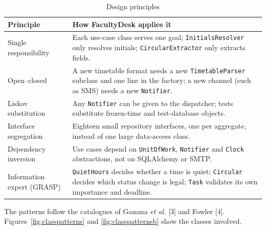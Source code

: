 \begin{xltabular}{\textwidth}{|p{3.6cm}|Y|}
\caption{Design principles}\\
\hline
\textbf{Principle} & \textbf{How FacultyDesk applies it} \\ \hline
Single responsibility & Each use-case class serves one goal; \texttt{InitialsResolver} only resolves initials; \texttt{CircularExtractor} only extracts fields. \\ \hline
Open--closed & A new timetable format needs a new \texttt{TimetableParser} subclass and one line in the factory; a new channel (such as SMS) needs a new \texttt{Notifier}. \\ \hline
Liskov substitution & Any \texttt{Notifier} can be given to the dispatcher; tests substitute frozen-time and test-database objects. \\ \hline
Interface segregation & Eighteen small repository interfaces, one per aggregate, instead of one large data-access class. \\ \hline
Dependency inversion & Use cases depend on \texttt{UnitOfWork}, \texttt{Notifier} and \texttt{Clock} abstractions, not on SQLAlchemy or SMTP. \\ \hline
Information expert (GRASP) & \texttt{QuietHours} decides whether a time is quiet; \texttt{Circular} decides which status change is legal; \texttt{Task} validates its own importance and deadline. \\ \hline
\end{xltabular}

The patterns follow the catalogues of Gamma \emph{et al.} [3] and Fowler [4]. Figures~\ref{fig:classpatterns} and \ref{fig:classpatternsb} show the classes involved.

